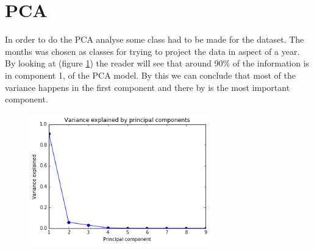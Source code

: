 \section*{PCA}
In order to do the PCA analyse some class had to be made for the dataset. The months was chosen as classes for trying to project the data in aspect of a year. 
By looking at (figure \ref{fig:pca_2}) the reader will see that around 90\% of the information is in component 1, of the PCA model. By this we can conclude that most of the variance happens in the first component and there by is the most important component. 

\vspace{-5pt}
\begin{figure}[H]
	\centering
	\includegraphics[width=0.7\textwidth]{images/pca/pca_2.png}
	\vspace{-5pt}
	\label{fig:pca_2}
\end{figure}